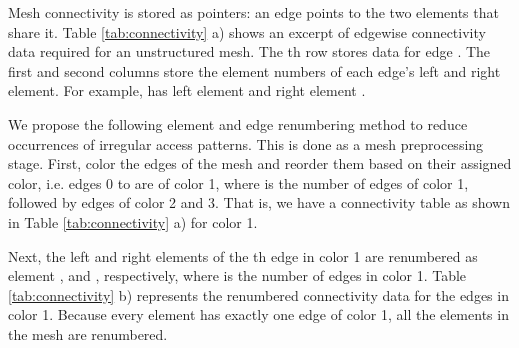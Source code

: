 \documentclass[12pt]{article}
\begin{document}
	
	\begin{table}

				\caption{Execution runtimes for 1000 timesteps of the double Mach test problem with  on mesh D presented in Table \ref{tab:tri} for different data reorganization strategies.  The number in parentheses is the percent speed-up relative to the unordered, unrenumbered mesh of five colors.}
				\label{tab:timing}
		\end{table}
	
	

	Mesh connectivity is stored as pointers: an edge points to the two elements that share it.  Table \ref{tab:connectivity} a) shows an excerpt of edgewise connectivity data required for an unstructured mesh.  The th row stores data for edge .  The first and second columns store the element numbers of each edge's left and right element.  For example,  has left element  and right element .
	
	We propose the following element and edge renumbering method to reduce occurrences of irregular access patterns.  This is done as a mesh preprocessing stage.  First, color the edges of the mesh and reorder them based on their assigned color, i.e. edges 0 to  are of color 1, where  is the number of edges of color 1, followed by edges of color 2 and 3.  That is, we have a connectivity table as shown in Table \ref{tab:connectivity} a) for color 1.
	
	Next, the left and right elements of the th edge in color 1 are renumbered as element , and , respectively, where  is the number of edges in color 1.  Table \ref{tab:connectivity} b) represents the renumbered connectivity data for the edges in color 1.  Because every element has exactly one edge of color 1, all the elements in the mesh are renumbered.
	
\end{document}
